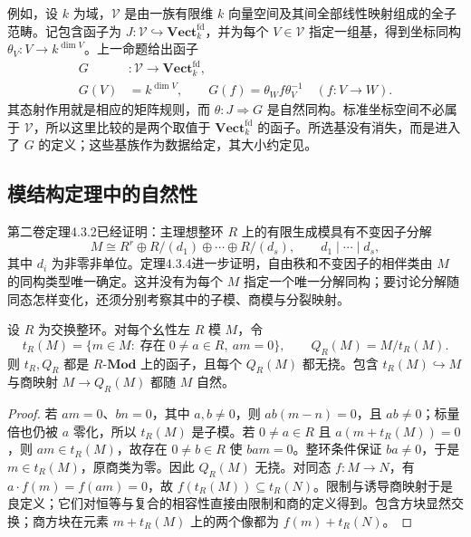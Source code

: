 例如，设 \(k\) 为域，\(\mathcal V\) 是由一族有限维 \(k\) 向量空间及其间全部线性映射组成的全子范畴。记包含函子为 \(J:\mathcal V\hookrightarrow\mathbf{Vect}_k^{\mathrm{fd}}\)，并为每个 \(V\in\mathcal V\) 指定一组基，得到坐标同构 \(\theta_V:V\rightarrow k^{\dim V}\)。上一命题给出函子
\[
	\begin{aligned}
		G&:\mathcal V\longrightarrow\mathbf{Vect}_k^{\mathrm{fd}},\\
		G(V)&=k^{\dim V},\qquad G(f)=\theta_Wf\theta_V^{-1}\quad(f:V\longrightarrow W).
	\end{aligned}
\]
其态射作用就是相应的矩阵规则，而 \(\theta:J\Rightarrow G\) 是自然同构。标准坐标空间不必属于 \(\mathcal V\)，所以这里比较的是两个取值于 \(\mathbf{Vect}_k^{\mathrm{fd}}\) 的函子。所选基没有消失，而是进入了 \(G\) 的定义；这些基族作为数据给定，其大小约定见。

\subsection{模结构定理中的自然性}
\label{b4:subsec:0104:03}

第二卷定理4.3.2已经证明：主理想整环 \(R\) 上的有限生成模具有不变因子分解
\[
	M\cong R^r\oplus R/(d_1)\oplus\cdots\oplus R/(d_s), \qquad d_1\mid\cdots\mid d_s,
\]
其中 \(d_i\) 为非零非单位。定理4.3.4进一步证明，自由秩和不变因子的相伴类由 \(M\) 的同构类型唯一确定。这并没有为每个 \(M\) 指定一个唯一分解同构；要讨论分解随同态怎样变化，还须分别考察其中的子模、商模与分裂映射。

\begin{proposition}\label{b4:prop:torsion-quotient-functor}
	设 \(R\) 为交换整环。对每个幺性左 \(R\) 模 \(M\)，令
	\[
		t_R(M)=\{m\in M:\;\text{存在}\;0\ne a\in R,\ am=0\}, \qquad Q_R(M)=M/t_R(M).
	\]
	则 \(t_R,Q_R\) 都是 \(R\text{-}\mathbf{Mod}\) 上的函子，且每个 \(Q_R(M)\) 都无挠。包含 \(t_R(M)\hookrightarrow M\) 与商映射 \(M\rightarrow Q_R(M)\) 都随 \(M\) 自然。
\end{proposition}
\begin{proof}
	若 \(am=0\)、\(bn=0\)，其中 \(a,b\ne0\)，则 \(ab(m-n)=0\)，且 \(ab\ne0\)；标量倍也仍被 \(a\) 零化，所以 \(t_R(M)\) 是子模。若 \(0\ne a\in R\) 且 \(a(m+t_R(M))=0\)，则 \(am\in t_R(M)\)，故存在 \(0\ne b\in R\) 使 \(bam=0\)。整环条件保证 \(ba\ne0\)，于是 \(m\in t_R(M)\)，原商类为零。因此 \(Q_R(M)\) 无挠。对同态 \(f:M\rightarrow N\)，有 \(a\cdot f(m)=f(am)=0\)，故 \(f(t_R(M))\subseteq t_R(N)\)。限制与诱导商映射于是良定义；它们对恒等与复合的相容性直接由限制和商的定义得到。包含方块显然交换；商方块在元素 \(m+t_R(M)\) 上的两个像都为 \(f(m)+t_R(N)\)。
\end{proof}

